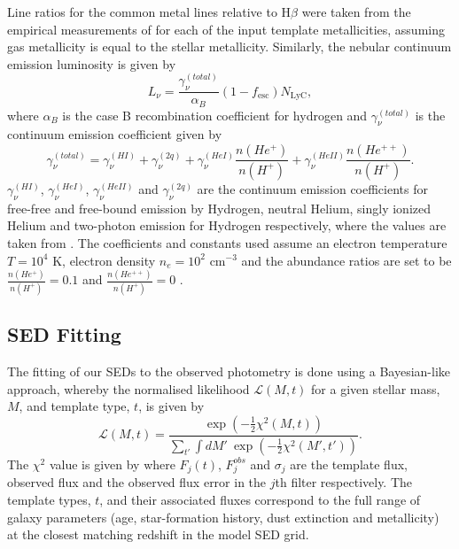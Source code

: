 Line ratios for the common metal lines relative to H$\beta$ were taken from the empirical measurements of \cite{Anders:2003ci} for each of the input template metallicities, assuming gas metallicity is equal to the stellar metallicity.
Similarly, the nebular continuum emission luminosity is given by
\begin{equation}
\label{eq:continuum}
L_{\nu} = \frac{\gamma^{(total)}_{\nu}} {\alpha_{B}}(1-f_{\text{esc}}) N_{\text{LyC}},
\end{equation}
where $\alpha_{B}$ is the case B recombination coefficient for hydrogen and $\gamma^{(total)}_{\nu}$ is the continuum emission coefficient given by
\begin{equation}\label{eq:cont_sep}
\gamma^{(total)}_{\nu} = \gamma^{(HI)}_{\nu} + \gamma^{(2q)}_{\nu} +  \gamma^{(HeI)}_{\nu}\frac{n(He^{+})} {n(H^{+})} + \gamma^{(HeII)}_{\nu}\frac{n(He^{++})} {n(H^{+})}
.\end{equation}
$\gamma^{(HI)}_{\nu}$, $\gamma^{(HeI)}_{\nu}$, $\gamma^{(HeII)}_{\nu}$ and $\gamma^{(2q)}_{\nu}$ are the continuum emission coefficients for free-free and free-bound emission by Hydrogen, neutral Helium, singly ionized Helium and two-photon emission for Hydrogen respectively, where the values are taken from \cite{Osterbrock:2006ula}. The coefficients and constants used assume an electron temperature $T=10^4$ K, electron density $n_{e}=10^2$ cm$^{-3}$ and the abundance ratios are set to be $\frac{n(He^{+})} {n(H^{+})} = 0.1$ and $\frac{n(He^{++})} {n(H^{+})} = 0$ \citep{1995A&A...303...41K}.

\subsection{SED Fitting}
The fitting of our SEDs to the observed photometry is done using a Bayesian-like approach, whereby the normalised likelihood $\mathcal{L}(M,t)$ for a given stellar mass, $M$, and template type, $t$, is given by
\begin{equation}
 \mathcal{L}(M,t) = \frac{\exp(-\tfrac{1}{2}\chi^{2}(M,t))}
          {\sum_{t'} \int dM' ~ \exp(-\tfrac{1}{2}\chi^{2}(M',t'))}.
\end{equation}
The $\chi^2$ value is given by where $F_{j}(t)$, $F_{j}^{obs}$ and $\sigma_{j}$ are the template flux, observed flux and the observed flux error in the $j$th filter respectively. The template types, $t$, and their associated fluxes correspond to the full range of galaxy parameters (age, star-formation history, dust extinction and metallicity) at the closest matching redshift in the model SED grid.

